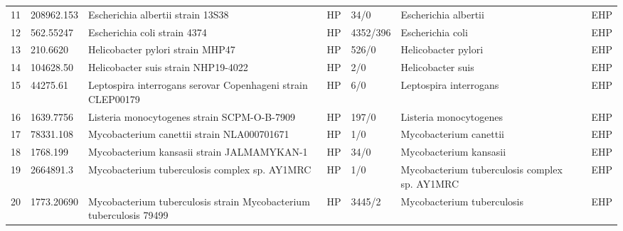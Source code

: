\begin{longtable}{llllllll}
11  &    208962.153 &                                        Escherichia albertii strain 13S38 &    HP &      34/0 &                           Escherichia albertii &                                          \cite{ooka2013human} &   EHP \\
12  &     562.55247 &                                             Escherichia coli strain 4374 &    HP &  4352/396 &                               Escherichia coli &                                   \cite{jesumirhewe2020whole} &   EHP \\
13  &      210.6620 &                                         Helicobacter pylori strain MHP47 &    HP &     526/0 &                            Helicobacter pylori &                             \cite{saranathan2020helicobacter} &   EHP \\
14  &     104628.50 &                                      Helicobacter suis strain NHP19-4022 &    HP &       2/0 &                              Helicobacter suis &                                 \cite{haesebrouck2009gastric} &   EHP \\
15  &      44275.61 &              Leptospira interrogans serovar Copenhageni strain CLEP00179 &    HP &       6/0 &                         Leptospira interrogans &                                      \cite{trindade2020draft} &   EHP \\
16  &     1639.7756 &                              Listeria monocytogenes strain SCPM-O-B-7909 &    HP &     197/0 &                         Listeria monocytogenes &                                  \cite{ramaswamy2007listeria} &   EHP \\
17  &     78331.108 &                               Mycobacterium canettii strain NLA000701671 &    HP &       1/0 &                         Mycobacterium canettii &                                      \cite{supply2017biology} &   EHP \\
18  &      1768.199 &                               Mycobacterium kansasii strain JALMAMYKAN-1 &    HP &      34/0 &                         Mycobacterium kansasii &                                   \cite{jagielski2020genomic} &   EHP \\
19  &     2664891.3 &                            Mycobacterium tuberculosis complex sp. AY1MRC &    HP &       1/0 &  Mycobacterium tuberculosis complex sp. AY1MRC &                                   \cite{abdelhaleem2020whole} &   EHP \\
20  &    1773.20690 &       Mycobacterium tuberculosis strain Mycobacterium tuberculosis 79499 &    HP &    3445/2 &                     Mycobacterium tuberculosis &                                         \cite{bottai2020tbd1} &   EHP \\

\end{longtable}
